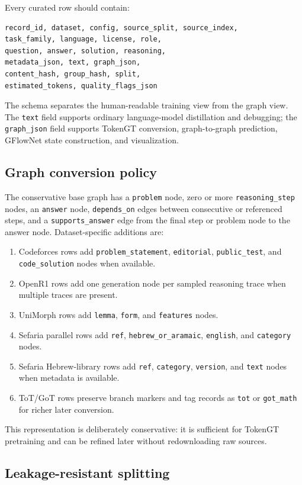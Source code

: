 \documentclass[11pt]{article}
\theoremstyle{definition}
\theoremstyle{plain}
\theoremstyle{remark}
\numberwithin{equation}{section}
\begin{document}
Every curated row should contain:
\begin{verbatim}
record_id, dataset, config, source_split, source_index,
task_family, language, license, role,
question, answer, solution, reasoning,
metadata_json, text, graph_json,
content_hash, group_hash, split,
estimated_tokens, quality_flags_json
\end{verbatim}
The schema separates the human-readable training view from the graph view.  The \texttt{text} field supports ordinary language-model distillation and debugging; the \texttt{graph\_json} field supports TokenGT conversion, graph-to-graph prediction, GFlowNet state construction, and visualization.

\subsection{Graph conversion policy}

The conservative base graph has a \texttt{problem} node, zero or more \texttt{reasoning\_step} nodes, an \texttt{answer} node, \texttt{depends\_on} edges between consecutive or referenced steps, and a \texttt{supports\_answer} edge from the final step or problem node to the answer node.  Dataset-specific additions are:
\begin{enumerate}[leftmargin=2em]
  \item Codeforces rows add \texttt{problem\_statement}, \texttt{editorial}, \texttt{public\_test}, and \texttt{code\_solution} nodes when available.
  \item OpenR1 rows add one generation node per sampled reasoning trace when multiple traces are present.
  \item UniMorph rows add \texttt{lemma}, \texttt{form}, and \texttt{features} nodes.
  \item Sefaria parallel rows add \texttt{ref}, \texttt{hebrew\_or\_aramaic}, \texttt{english}, and \texttt{category} nodes.
  \item Sefaria Hebrew-library rows add \texttt{ref}, \texttt{category}, \texttt{version}, and \texttt{text} nodes when metadata is available.
  \item ToT/GoT rows preserve branch markers and tag records as \texttt{tot} or \texttt{got\_math} for richer later conversion.
\end{enumerate}
This representation is deliberately conservative: it is sufficient for TokenGT pretraining and can be refined later without redownloading raw sources.

\subsection{Leakage-resistant splitting}
\end{document}
